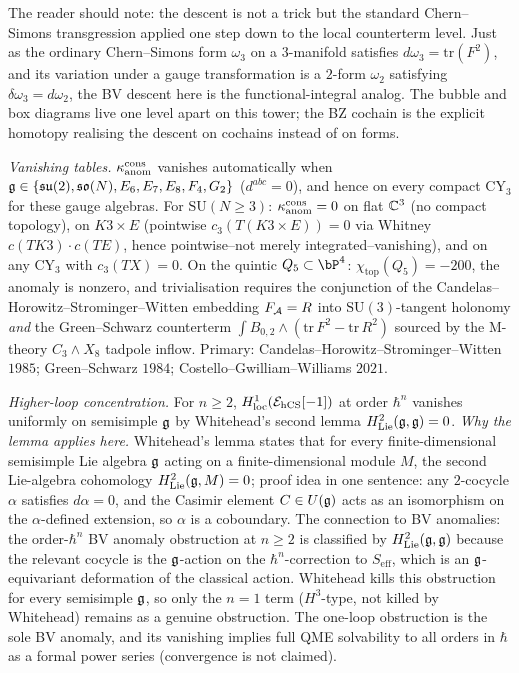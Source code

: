 \begin{theorem}
The reader should note: the descent is not a trick but the standard
Chern--Simons transgression applied one step down to the local
counterterm level. Just as the ordinary Chern--Simons form $\omega_3$
on a $3$-manifold satisfies $d\omega_3 = \mathrm{tr}(F^2)$, and its
variation under a gauge transformation is a $2$-form $\omega_2$
satisfying $\delta\omega_3 = d\omega_2$, the BV descent here is the
functional-integral analog. The bubble and box diagrams live one
level apart on this tower; the BZ cochain is the explicit homotopy
realising the descent on cochains instead of on forms.

\emph{Vanishing tables.} $\kappa_{\mathrm{anom}}^{\mathrm{cons}}$ vanishes
automatically when $\mathfrak{g} \in \{\mathfrak{su}(2), \mathfrak{so}(N), E_6,
E_7, E_8, F_4, G_2\}$ ($d^{abc} = 0$), and hence on every compact
CY$_3$ for these gauge algebras. For $\mathrm{SU}(N \geq 3)$:
$\kappa_{\mathrm{anom}}^{\mathrm{cons}} = 0$ on flat $\mathbb{C}^3$ (no compact topology), on
$K3 \times E$ (pointwise $c_3(T(K3\times E)) = 0$ via Whitney
$c(TK3)\cdot c(TE)$, hence pointwise--not merely integrated--vanishing),
and on any CY$_3$ with $c_3(TX) = 0$. On the quintic
$Q_5 \subset \bP^4$: $\chi_{\mathrm{top}}(Q_5) = -200$, the anomaly is
nonzero, and trivialisation requires the conjunction of the
Candelas--Horowitz--Strominger--Witten embedding $F_{\mathcal{A}} = R$ into
$\mathrm{SU}(3)$-tangent holonomy \emph{and} the Green--Schwarz
counterterm $\int B_{0,2} \wedge (\mathrm{tr}\, F^2 - \mathrm{tr}\, R^2)$
sourced by the M-theory $C_3 \wedge X_8$ tadpole inflow. Primary:
Candelas--Horowitz--Strominger--Witten $1985$; Green--Schwarz $1984$;
Costello--Gwilliam--Williams $2021$.

\emph{Higher-loop concentration.} For $n \geq 2$,
$H^1_{\mathrm{loc}}(\mathcal{E}_{\mathrm{hCS}}[-1])$ at order $\hbar^n$ vanishes
uniformly on semisimple $\mathfrak{g}$ by Whitehead's second lemma
$H^2_{\mathrm{Lie}}(\mathfrak{g}, \mathfrak{g}) = 0$. \emph{Why the lemma applies here.}
Whitehead's lemma states that for every finite-dimensional semisimple
Lie algebra $\mathfrak{g}$ acting on a finite-dimensional module $M$, the
second Lie-algebra cohomology $H^2_{\mathrm{Lie}}(\mathfrak{g}, M) = 0$;
proof idea in one sentence: any $2$-cocycle $\alpha$ satisfies
$d\alpha = 0$, and the Casimir element $C \in U(\mathfrak{g})$ acts as an
isomorphism on the $\alpha$-defined extension, so $\alpha$ is a
coboundary. The connection to BV anomalies: the order-$\hbar^n$ BV
anomaly obstruction at $n \ge 2$ is classified by
$H^2_{\mathrm{Lie}}(\mathfrak{g}, \mathfrak{g})$ because the relevant cocycle is the
$\mathfrak{g}$-action on the $\hbar^n$-correction to $S_{\mathrm{eff}}$, which
is an $\mathfrak{g}$-equivariant deformation of the classical action. Whitehead
kills this obstruction for every semisimple $\mathfrak{g}$, so only the
$n = 1$ term ($H^3$-type, not killed by Whitehead) remains as a
genuine obstruction. The one-loop obstruction is the sole BV
anomaly, and its vanishing implies full QME solvability to all
orders in $\hbar$ as a formal power series (convergence is not
claimed).
\end{theorem}

